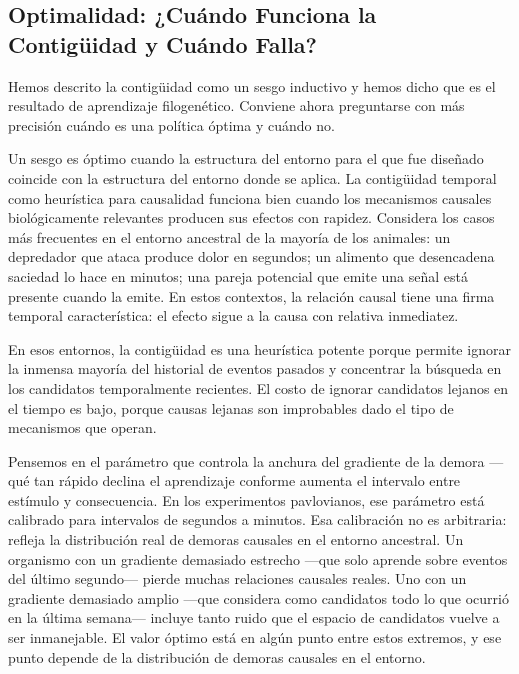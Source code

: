 \documentclass[
  letterpaper,
  DIV=11,
  numbers=noendperiod]{scrreprt}
\begin{document}
\begin{tcolorbox}[enhanced jigsaw, toprule=.15mm, arc=.35mm, colback=white, opacityback=0, colframe=quarto-callout-note-color-frame, breakable, rightrule=.15mm, left=2mm, leftrule=.75mm, bottomrule=.15mm]
\section{Optimalidad: ¿Cuándo Funciona la Contigüidad y Cuándo
Falla?}\label{optimalidad-cuuxe1ndo-funciona-la-contiguxfcidad-y-cuuxe1ndo-falla}

Hemos descrito la contigüidad como un sesgo inductivo y hemos dicho que
es el resultado de aprendizaje filogenético. Conviene ahora preguntarse
con más precisión cuándo es una política óptima y cuándo no.

Un sesgo es óptimo cuando la estructura del entorno para el que fue
diseñado coincide con la estructura del entorno donde se aplica. La
contigüidad temporal como heurística para causalidad funciona bien
cuando los mecanismos causales biológicamente relevantes producen sus
efectos con rapidez. Considera los casos más frecuentes en el entorno
ancestral de la mayoría de los animales: un depredador que ataca produce
dolor en segundos; un alimento que desencadena saciedad lo hace en
minutos; una pareja potencial que emite una señal está presente cuando
la emite. En estos contextos, la relación causal tiene una firma
temporal característica: el efecto sigue a la causa con relativa
inmediatez.

En esos entornos, la contigüidad es una heurística potente porque
permite ignorar la inmensa mayoría del historial de eventos pasados y
concentrar la búsqueda en los candidatos temporalmente recientes. El
costo de ignorar candidatos lejanos en el tiempo es bajo, porque causas
lejanas son improbables dado el tipo de mecanismos que operan.

Pensemos en el parámetro que controla la anchura del gradiente de la
demora ---qué tan rápido declina el aprendizaje conforme aumenta el
intervalo entre estímulo y consecuencia. En los experimentos
pavlovianos, ese parámetro está calibrado para intervalos de segundos a
minutos. Esa calibración no es arbitraria: refleja la distribución real
de demoras causales en el entorno ancestral. Un organismo con un
gradiente demasiado estrecho ---que solo aprende sobre eventos del
último segundo--- pierde muchas relaciones causales reales. Uno con un
gradiente demasiado amplio ---que considera como candidatos todo lo que
ocurrió en la última semana--- incluye tanto ruido que el espacio de
candidatos vuelve a ser inmanejable. El valor óptimo está en algún punto
entre estos extremos, y ese punto depende de la distribución de demoras
causales en el entorno.


\end{tcolorbox}
\end{document}
